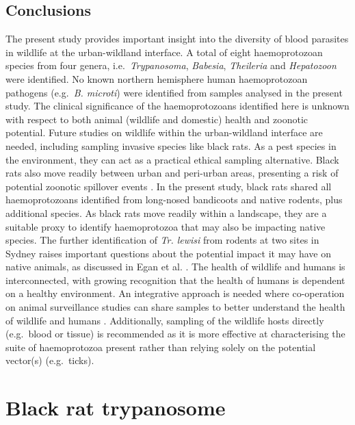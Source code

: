 \documentclass[a4paper, nobind]{templates/ociamthesis}
\begin{document}
\hypertarget{conclusions-1}{%
\section{Conclusions}\label{conclusions-1}}

The present study provides important insight into the diversity of blood parasites in wildlife at the urban-wildland interface.
A total of eight haemoprotozoan species from four genera, i.e.~\emph{Trypanosoma}, \emph{Babesia}, \emph{Theileria} and \emph{Hepatozoon} were identified.
No known northern hemisphere human haemoprotozoan pathogens (e.g.~\emph{B. microti}) were identified from samples analysed in the present study.
The clinical significance of the haemoprotozoans identified here is unknown with respect to both animal (wildlife and domestic) health and zoonotic potential.
Future studies on wildlife within the urban-wildland interface are needed, including sampling invasive species like black rats.
As a pest species in the environment, they can act as a practical ethical sampling alternative.
Black rats also move readily between urban and peri-urban areas, presenting a risk of potential zoonotic spillover events \autocite{banksReviewEvidencePotential2012}.
In the present study, black rats shared all haemoprotozoans identified from long-nosed bandicoots and native rodents, plus additional species.
As black rats move readily within a landscape, they are a suitable proxy to identify haemoprotozoa that may also be impacting native species.
The further identification of \emph{Tr. lewisi} from rodents at two sites in Sydney raises important questions about the potential impact it may have on native animals, as discussed in Egan et al. \autocite*{eganMolecularIdentificationTrypanosoma2020}.
The health of wildlife and humans is interconnected, with growing recognition that the health of humans is dependent on a healthy environment.
An integrative approach is needed where co-operation on animal surveillance studies can share samples to better understand the health of wildlife and humans \autocite{johansenPrevalenceNeutralisingAntibodies2005,cox-wittonEmergingInfectiousDiseases2014,hillmanUrbanEnvironmentsAlter2017}.
Additionally, sampling of the wildlife hosts directly (e.g.~blood or tissue) is recommended as it is more effective at characterising the suite of haemoprotozoa present rather than relying solely on the potential vector(s) (e.g.~ticks).

\hypertarget{black-rat}{%
\chapter{Black rat trypanosome}\label{black-rat}}
\end{document}
